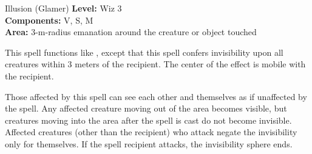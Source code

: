 {Illusion (Glamer)}
{
	\textbf{Level:}
	Wiz 3\\
	\textbf{Components:}
	V, S, M\\
	\textbf{Area:}
	3-m-radius emanation around the creature or object touched\\
}
{
	This spell functions like , except that this spell confers invisibility upon all creatures within 3 meters of the recipient. The center of the effect is mobile with the recipient.

	Those affected by this spell can see each other and themselves as if unaffected by the spell. Any affected creature moving out of the area becomes visible, but creatures moving into the area after the spell is cast do not become invisible. Affected creatures (other than the recipient) who attack negate the invisibility only for themselves. If the spell recipient attacks, the invisibility sphere ends.

}
